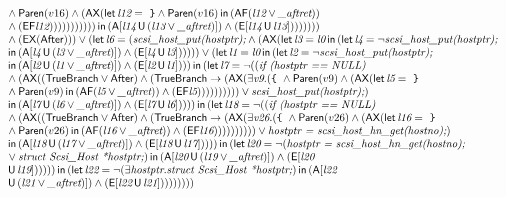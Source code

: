 \documentclass{article}
\newcommand{\U}{\,\mbox{\sf{U}}\,}
\newcommand{\A}{\mbox{\sf{A}}}
\newcommand{\E}{\mbox{\sf{E}}}
\newcommand{\AX}{\mbox{\sf{AX}}}
\newcommand{\EX}{\mbox{\sf{EX}}}
\newcommand{\AF}{\mbox{\sf{AF}}}
\newcommand{\EF}{\mbox{\sf{EF}}}
\newcommand{\mita}[1]{\mbox{\it{{#1}}}}
\newcommand{\msf}[1]{\mbox{\sf{{#1}}}}
\newcommand{\ttlb}{\mbox{\tt \char'173}}
\newcommand{\ttrb}{\mbox{\tt \char'175}}
\begin{document}
\[\begin{array}{l}
{  } \wedge \msf{Paren}(v16) \wedge (\AX(\mita{\sf{let}} \, \mita{l12} = \mita{
{\ttrb}} \wedge \msf{Paren}(v16) \, \mita{\sf{in}} \, (\AF(\mita{l12} \vee \mita{\_aftret}))\\\mbox{} \wedge (\EF\mita{l12})
)))))))))) \, \mita{\sf{in}} \, (\A[\mita{l14} \U (\mita{l13} \vee \mita{\_aftret})]
) \wedge (\E[\mita{l14} \U \mita{l13}]
)
)
)))))\\\mbox{} \wedge (\EX(\msf{After}))) \vee (\mita{\sf{let}} \, \mita{l6} = (\mita{scsi\_host\_put(hostptr);} \wedge (\AX(\mita{\sf{let}} \, \mita{l3} = \mita{l0} \, \mita{\sf{in}} \, (\mita{\sf{let}} \, \mita{l4} = \neg \mita{scsi\_host\_put(hostptr);}\\\mbox{} \, \mita{\sf{in}} \, (\A[\mita{l4} \U (\mita{l3} \vee \mita{\_aftret})]
) \wedge (\E[\mita{l4} \U \mita{l3}]
)
)
))) \vee (\mita{\sf{let}} \, \mita{l1} = \mita{l0} \, \mita{\sf{in}} \, (\mita{\sf{let}} \, \mita{l2} = \neg \mita{scsi\_host\_put(hostptr);}\\\mbox{} \, \mita{\sf{in}} \, (\A[\mita{l2} \U (\mita{l1} \vee \mita{\_aftret})]
) \wedge (\E[\mita{l2} \U \mita{l1}]
)
)
) \, \mita{\sf{in}} \, (\mita{\sf{let}} \, \mita{l7} = \neg ((\mita{if (hostptr == NULL) }\\\mbox{} \wedge (\AX((\msf{TrueBranch} \vee \msf{After}) \wedge (\msf{TrueBranch} \rightarrow (\AX(\exists \mita{v9} . (\mita{{\ttlb}
  } \wedge \msf{Paren}(v9) \wedge (\AX(\mita{\sf{let}} \, \mita{l5} = \mita{
{\ttrb}}\\\mbox{} \wedge \msf{Paren}(v9) \, \mita{\sf{in}} \, (\AF(\mita{l5} \vee \mita{\_aftret})) \wedge (\EF\mita{l5})
))))))))) \vee \mita{scsi\_host\_put(hostptr);})\\\mbox{} \, \mita{\sf{in}} \, (\A[\mita{l7} \U (\mita{l6} \vee \mita{\_aftret})]
) \wedge (\E[\mita{l7} \U \mita{l6}]
)
)
)
) \, \mita{\sf{in}} \, (\mita{\sf{let}} \, \mita{l18} = \neg ((\mita{if (hostptr == NULL) }\\\mbox{} \wedge (\AX((\msf{TrueBranch} \vee \msf{After}) \wedge (\msf{TrueBranch} \rightarrow (\AX(\exists \mita{v26} . (\mita{{\ttlb}
  } \wedge \msf{Paren}(v26) \wedge (\AX(\mita{\sf{let}} \, \mita{l16} = \mita{
{\ttrb}}\\\mbox{} \wedge \msf{Paren}(v26) \, \mita{\sf{in}} \, (\AF(\mita{l16} \vee \mita{\_aftret})) \wedge (\EF\mita{l16})
))))))))) \vee \mita{hostptr = scsi\_host\_hn\_get(hostno);})\\\mbox{} \, \mita{\sf{in}} \, (\A[\mita{l18} \U (\mita{l17} \vee \mita{\_aftret})]
) \wedge (\E[\mita{l18} \U \mita{l17}]
)
)
)) \, \mita{\sf{in}} \, (\mita{\sf{let}} \, \mita{l20} = \neg (\mita{hostptr = scsi\_host\_hn\_get(hostno);}\\\mbox{} \vee \mita{struct Scsi\_Host *hostptr;}) \, \mita{\sf{in}} \, (\A[\mita{l20} \U (\mita{l19} \vee \mita{\_aftret})]
) \wedge (\E[\mita{l20}\\\mbox{} \U \mita{l19}]
)
)
))) \, \mita{\sf{in}} \, (\mita{\sf{let}} \, \mita{l22} = \neg (\exists \mita{hostptr} . \mita{struct Scsi\_Host *hostptr;}) \, \mita{\sf{in}} \, (\A[\mita{l22}\\\mbox{} \U (\mita{l21} \vee \mita{\_aftret})]
) \wedge (\E[\mita{l22} \U \mita{l21}]
)
)
))))))


\end{array}\]
\end{document}
